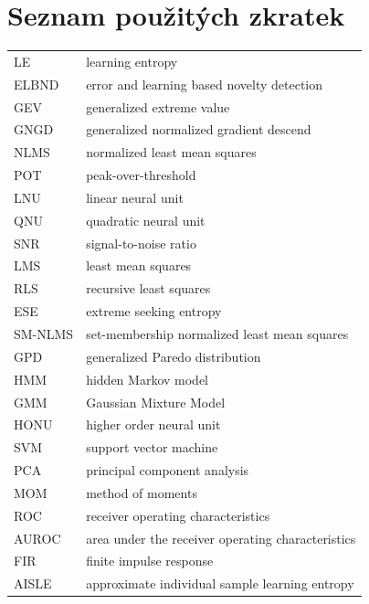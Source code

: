 
\cleardoublepage
\thispagestyle{empty}

\chapter*{Seznam použitých zkratek}
\begin{tabular}{ll}
LE                      & learning entropy                              \\
ELBND                   & error and learning based novelty detection      \\
GEV                     & generalized extreme value                       \\
GNGD                    & generalized normalized gradient descend         \\
NLMS                    & normalized least mean squares                   \\
POT                     & peak-over-threshold                             \\
LNU                     & linear neural unit                              \\
QNU                     & quadratic neural unit                           \\
SNR                     & signal-to-noise ratio                           \\
LMS						& least mean squares							\\
RLS                     & recursive least squares                         \\
ESE                     & extreme seeking entropy                         \\
SM-NLMS                 & set-membership normalized least mean squares \\
GPD						& generalized Paredo distribution \\
HMM						& hidden Markov model \\
GMM						& Gaussian Mixture Model \\
HONU					& higher order neural unit \\
SVM						& support vector machine \\
PCA						& principal component analysis \\
MOM						& method of moments \\
ROC						& receiver operating characteristics \\
AUROC					& area under the receiver operating characteristics\\
FIR						& finite impulse response \\
AISLE					& approximate individual sample learning entropy \\


\end{tabular}

